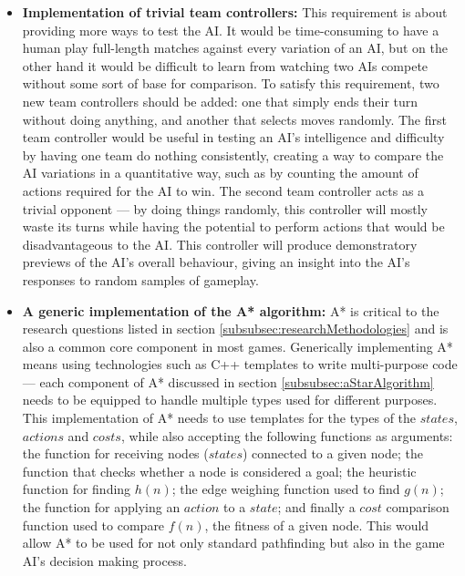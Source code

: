 \documentclass[11pt, a4paper]{article}
\begin{document}
\begin{itemize}
\item \textbf{Implementation of trivial team controllers:}
This requirement is about providing more ways to test the AI. It would be time-consuming to have a human play full-length matches against every variation of an AI, but on the other hand it would be difficult to learn from watching two AIs compete without some sort of base for comparison. To satisfy this requirement, two new team controllers should be added: one that simply ends their turn without doing anything, and another that selects moves randomly. The first team controller would be useful in testing an AI's intelligence and difficulty by having one team do nothing consistently, creating a way to compare the AI variations in a quantitative way, such as by counting the amount of actions required for the AI to win. The second team controller acts as a trivial opponent --- by doing things randomly, this controller will mostly waste its turns while having the potential to perform actions that would be disadvantageous to the AI. This controller will produce demonstratory previews of the AI's overall behaviour, giving an insight into the AI's responses to random samples of gameplay.

\item \textbf{A generic implementation of the A* algorithm:}
A* is critical to the research questions listed in section \ref{subsubsec:researchMethodologies} and is also a common core component in most games. Generically implementing A* means using technologies such as C++ templates to write multi-purpose code --- each component of A* discussed in section \ref{subsubsec:aStarAlgorithm} needs to be equipped to handle multiple types used for different purposes. This implementation of A* needs to use templates for the types of the $states$, $actions$ and $costs$, while also accepting the following functions as arguments: the function for receiving nodes ($states$) connected to a given node; the function that checks whether a node is considered a goal; the heuristic function for finding $h(n)$; the edge weighing function used to find $g(n)$; the function for applying an $action$ to a $state$; and finally a $cost$ comparison function used to compare $f(n)$, the fitness of a given node. This would allow A* to be used for not only standard pathfinding but also in the game AI's decision making process.


\end{itemize}
\end{document}
